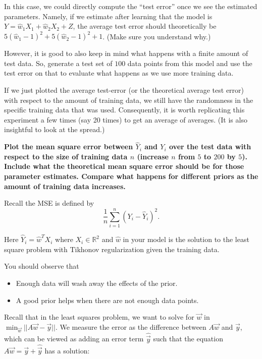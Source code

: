 \begin{Parts}
In this case, we could directly compute the ``test error'' once we see
the estimated parameters. Namely, if we estimate after learning that
the model is $Y = \widehat{w}_1 X_1 + \widehat{w}_2 X_2 + Z$, the
average test error should theoretically be $5(\widehat{w}_1-1)^2 +5(\widehat{w}_2 -
1)^2 + 1$. (Make sure you understand why.)

However, it is good to also keep in mind what happens with a finite
amount of test data. So, generate a test set of $100$ data points
from this model and use the test error on that to evaluate what
happens as we use more training data. 

If we just plotted the average test-error (or the theoretical average
test error) with respect to the amount of training data, we still have
the randomness in the specific training data that was
used. Consequently, it is worth replicating this experiment a few
times (say 20 times) to get an average of averages. (It is also
insightful to look at the spread.) 

{\bf Plot the mean square error between $\hat Y_i$ and $Y_i$ over the
  test data with respect to the size of training data $n$ (increase
  $n$ from $5$ to $200$ by $5$). Include what the theoretical mean
  square error should be for those parameter estimates. Compare what
  happens for different priors as the amount of training data increases.}

Recall the MSE is defined by
\begin{equation}
\frac{1}{n}\sum_{i=1}^n(Y_i-\hat{Y}_i)^2. 
\end{equation}

Here $\hat{Y}_i = \widehat{w}^TX_i$ where $X_i\in\mathbb{R}^2$ and
$\widehat{w}$ in your model is the solution to the least square
problem with Tikhonov regularization given the training data.   

You should observe that
\begin{itemize}
    \item Enough data will wash away the effects of the prior.
    \item A good prior helps when there are not enough data points.
\end{itemize}
\end{Parts}

Recall that in the least squares problem, we want to solve for $\vec{w}$ in $\min_{\vec{w}}{||A\vec{w}-\vec{y}||}$. We measure the error as the difference between $A\vec{w}$ and $\vec{y}$, which can be viewed as adding an error term $\hat{\vec{y}}$ such that the equation $A\vec{w}=\vec{y}+\hat{\vec{y}}$ has a solution:

